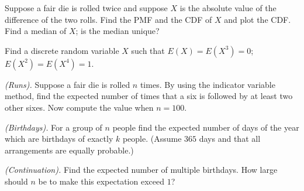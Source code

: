 \begin{problem}[Handout 6, \# 5]
  Suppose a fair die is rolled twice and suppose \(X\) is the absolute
  value of the difference of the two rolls. Find the PMF and the CDF of
  \(X\) and plot the CDF. Find a median of \(X\); is the median unique?
\end{problem}
\begin{solution}

\end{solution}
\newpage

\begin{problem}[Handout 6, \# 7]
  Find a discrete random variable \(X\) such that \(E(X)=E(X^3)=0\);
  \(E(X^2)=E(X^4)=1\).
\end{problem}
\begin{solution}

\end{solution}
\newpage

\begin{problem}[Handout 6, \# 9]
  \emph{(Runs).} Suppose a fair die is rolled \(n\) times. By using the
  indicator variable method, find the expected number of times that a six
  is followed by at least two other sixes. Now compute the value when
  \(n=100\).
\end{problem}
\begin{solution}

\end{solution}
\newpage

\begin{problem}[Handout 6, \# 10]
  \emph{(Birthdays).} For a group of \(n\) people find the expected number
  of days of the year which are birthdays of exactly \(k\) people. (Assume
  \(365\) days and that all arrangements are equally probable.)
\end{problem}
\begin{solution}

\end{solution}
\newpage

\begin{problem}[Handout 6, \# 11]
  \emph{(Continuation).} Find the expected number of multiple
  birthdays. How large should \(n\) be to make this expectation exceed
  \(1\)?
\end{problem}
\begin{solution}

\end{solution}
\newpage

